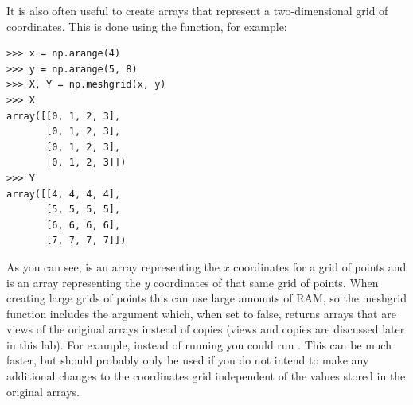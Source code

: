 It is also often useful to create arrays that represent a two-dimensional grid of coordinates.
This is done using the  function, for example:
\begin{lstlisting}
>>> x = np.arange(4)
>>> y = np.arange(5, 8)
>>> X, Y = np.meshgrid(x, y)
>>> X
array([[0, 1, 2, 3],
       [0, 1, 2, 3],
       [0, 1, 2, 3],
       [0, 1, 2, 3]])
>>> Y
array([[4, 4, 4, 4],
       [5, 5, 5, 5],
       [6, 6, 6, 6],
       [7, 7, 7, 7]])
\end{lstlisting}
As you can see,  is an array representing the $x$ coordinates for a grid of points and  is an array representing the $y$ coordinates of that same grid of points.
When creating large grids of points this can use large amounts of RAM, so the meshgrid function includes the  argument which, when set to false, returns arrays that are views of the original arrays instead of copies (views and copies are discussed later in this lab).
For example, instead of running  you could run .
This can be much faster, but should probably only be used if you do not intend to make any additional changes to the coordinates grid independent of the values stored in the original arrays.

